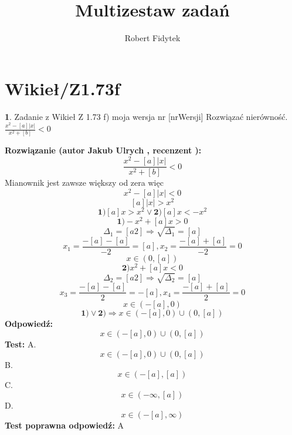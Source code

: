 \documentclass[12pt, a4paper]{article}
\title{Multizestaw zadań}
\author{Robert Fidytek}
\date{}
\theoremstyle{definition} %
\newtheorem{zad}{}
\newcommand{\kategoria}[1]{\section{#1}} %
\newcommand{\zadStart}[1]{\begin{zad}#1\newline} %
\newcommand{\zadStop}{\end{zad}}   %
\newcommand{\rozwStart}[2]{\noindent \textbf{Rozwiązanie (autor #1 , recenzent #2): }\newline} %
\newcommand{\rozwStop}{\newline}                                            %
\newcommand{\odpStart}{\noindent \textbf{Odpowiedź:}\newline}    %
\newcommand{\odpStop}{\newline}                                             %
\newcommand{\testStart}{\noindent \textbf{Test:}\newline} %
\newcommand{\testStop}{\newline} %
\newcommand{\kluczStart}{\noindent \textbf{Test poprawna odpowiedź:}\newline} %
\newcommand{\kluczStop}{\newline} %
\begin{document}
\maketitle


\kategoria{Wikieł/Z1.73f}
\zadStart{Zadanie z Wikieł Z 1.73 f) moja wersja nr [nrWersji]}
Rozwiązać nierówność.$\frac{x^{2}-[a]|x|}{x^{2}+[b]}<0$
\zadStop
\rozwStart{Jakub Ulrych}{}
$$\frac{x^{2}-[a]|x|}{x^{2}+[b]}<0$$
Mianownik jest zawsze większy od zera więc
$$x^{2}-[a]|x|<0$$
$$[a]|x|>x^{2}$$
$$\textbf{1)}[a]x>x^{2}\vee\textbf{2)}[a]x<-x^{2}$$
$$\textbf{1)}-x^{2}+[a]x>0$$
$$\Delta_{1}=[a2]\Rightarrow \sqrt{\Delta_{1}}=[a]$$
$$x_{1}=\frac{-[a]-[a]}{-2}=[a],x_{2}=\frac{-[a]+[a]}{-2}=0$$
$$x\in(0,[a])$$
$$\textbf{2)}x^{2}+[a]x<0$$
$$\Delta_{2}=[a2]\Rightarrow \sqrt{\Delta_{2}}=[a]$$
$$x_{3}=\frac{-[a]-[a]}{2}=-[a],x_{4}=\frac{-[a]+[a]}{2}=0$$
$$x\in(-[a],0)$$
$$\textbf{1)}\vee\textbf{2)}\Rightarrow x\in(-[a],0)\cup(0,[a])$$
\rozwStop
\odpStart
$$x\in(-[a],0)\cup(0,[a])$$
\odpStop
\testStart
A.$$x\in(-[a],0)\cup(0,[a])$$
B.$$x\in(-[a],[a])$$
C.$$x\in(-\infty,[a])$$
D.$$x\in(-[a],\infty)$$
\testStop
\kluczStart
A
\kluczStop
\end{document}
